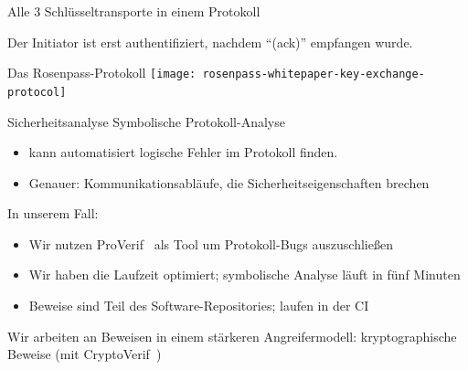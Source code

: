 \documentclass[german]{rosenpass-beamer}
\begin{document}
\begin{frame}{Alle 3 Schlüsseltransporte in einem Protokoll}


  Der Initiator ist erst authentifiziert, nachdem
  \enquote{(ack)} empfangen wurde.

\end{frame}

\begin{frame}{Das Rosenpass-Protokoll}
  \texttt{[image: rosenpass-whitepaper-key-exchange-protocol]}
\end{frame}

\begin{frame}{Sicherheitsanalyse}
  Symbolische Protokoll-Analyse
	\begin{itemize}
		\item kann automatisiert logische Fehler im Protokoll finden.
		\item Genauer: Kommunikationsabläufe, die Sicherheitseigenschaften brechen
\end{itemize}

In unserem Fall:
  \begin{itemize}
    \item Wir nutzen ProVerif~\cite{proverif} als Tool um Protokoll-Bugs auszuschließen
    \item Wir haben die Laufzeit optimiert; symbolische Analyse läuft in fünf Minuten
    \item Beweise sind Teil des Software-Repositories; laufen in der CI
  \end{itemize}

	Wir arbeiten an Beweisen in einem stärkeren Angreifermodell: kryptographische Beweise (mit CryptoVerif~\cite{cryptoverif})
\end{frame}
\end{document}
